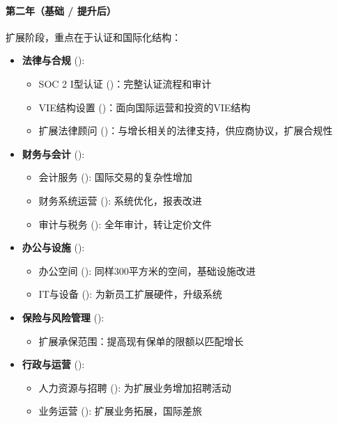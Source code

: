 \documentclass[11点, A4纸, 单面]{article}
\begin{document}
\paragraph{第二年（基础 / 提升后）}
扩展阶段，重点在于认证和国际化结构：

\begin{itemize}
    \item \textbf{法律与合规} ():
    \begin{itemize}
        \item SOC 2 I型认证 ()：完整认证流程和审计
        \item VIE结构设置 ()：面向国际运营和投资的VIE结构
        \item 扩展法律顾问 ()：与增长相关的法律支持，供应商协议，扩展合规性
    \end{itemize}



\item \textbf{财务与会计} ():
    \begin{itemize}
        \item 会计服务 (): 国际交易的复杂性增加
        \item 财务系统运营 (): 系统优化，报表改进
        \item 审计与税务 (): 全年审计，转让定价文件
    \end{itemize}
    
    \item \textbf{办公与设施} ():
    \begin{itemize}
        \item 办公空间 (): 同样300平方米的空间，基础设施改进
        \item IT与设备 (): 为新员工扩展硬件，升级系统
    \end{itemize}
    
    \item \textbf{保险与风险管理} ():
    \begin{itemize}
        \item 扩展承保范围：提高现有保单的限额以匹配增长
    \end{itemize}
    
    \item \textbf{行政与运营} ():
    \begin{itemize}
        \item 人力资源与招聘 (): 为扩展业务增加招聘活动
        \item 业务运营 (): 扩展业务拓展，国际差旅
    \end{itemize}
\end{itemize}
\end{document}
